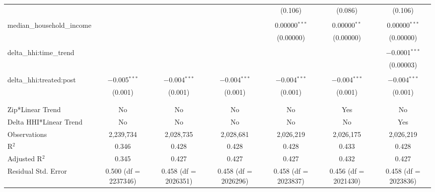 \begin{table}[H]
{\begin{tabular}{@{\extracolsep{5pt}}lcccccc}
   &  &  &  & (0.106) & (0.086) & (0.106) \\  

   & & & & & & \\  

  median\_household\_income &  &  &  & 0.00000$^{***}$ & 0.00000$^{**}$ & 0.00000$^{***}$ \\  

   &  &  &  & (0.00000) & (0.00000) & (0.00000) \\  

   & & & & & & \\  

  delta\_hhi:time\_trend &  &  &  &  &  & $-$0.0001$^{***}$ \\  

   &  &  &  &  &  & (0.00003) \\  

   & & & & & & \\  

  delta\_hhi:treated:post & $-$0.005$^{***}$ & $-$0.004$^{***}$ & $-$0.004$^{***}$ & $-$0.004$^{***}$ & $-$0.004$^{***}$ & $-$0.004$^{***}$ \\  

   & (0.001) & (0.001) & (0.001) & (0.001) & (0.001) & (0.001) \\  

   & & & & & & \\  

 \hline \\[-1.8ex]  

 Zip*Linear Trend & No & No & No & No & Yes & No \\  

 Delta HHI*Linear Trend & No & No & No & No & No & Yes \\  

 Observations & 2,239,734 & 2,028,735 & 2,028,681 & 2,026,219 & 2,026,175 & 2,026,219 \\  

 R$^{2}$ & 0.346 & 0.428 & 0.428 & 0.428 & 0.433 & 0.428 \\  

 Adjusted R$^{2}$ & 0.345 & 0.427 & 0.427 & 0.427 & 0.432 & 0.427 \\  

 Residual Std. Error & 0.500 (df = 2237346) & 0.458 (df = 2026351) & 0.458 (df = 2026296) & 0.458 (df = 2023837) & 0.456 (df = 2021430) & 0.458 (df = 2023836) \\  

 \hline  


\end{tabular}}
\end{table}
